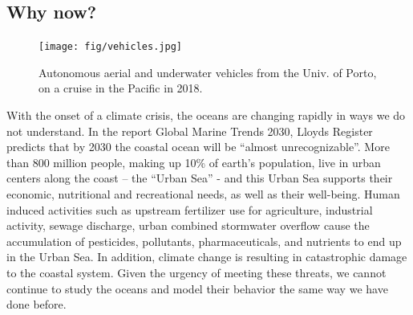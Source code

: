 \subsection{Why now?}

\begin{figure}[!t]
  \centering
  \texttt{[image: fig/vehicles.jpg]}
  \caption{Autonomous aerial and underwater vehicles from the Univ. of
    Porto, on a cruise in the Pacific in 2018.}
\label{fig:vehicles}
\end{figure}

With the onset of a climate crisis, the oceans are changing rapidly in
ways we do not understand.  In the report Global Marine Trends 2030,
Lloyds Register predicts that by 2030 the coastal ocean will be
“almost unrecognizable”. More than 800 million people, making up 10\%
of earth’s population, live in urban centers along the coast – the
“Urban Sea” - and this Urban Sea supports their economic, nutritional
and recreational needs, as well as their well-being. Human induced
activities such as upstream fertilizer use for agriculture, industrial
activity, sewage discharge, urban combined stormwater overflow cause
the accumulation of pesticides, pollutants, pharmaceuticals, and
nutrients to end up in the Urban Sea.  In addition, climate change is
resulting in catastrophic damage to the coastal system.  Given the
urgency of meeting these threats, we cannot continue to study the
oceans and model their behavior the same way we have done before.




